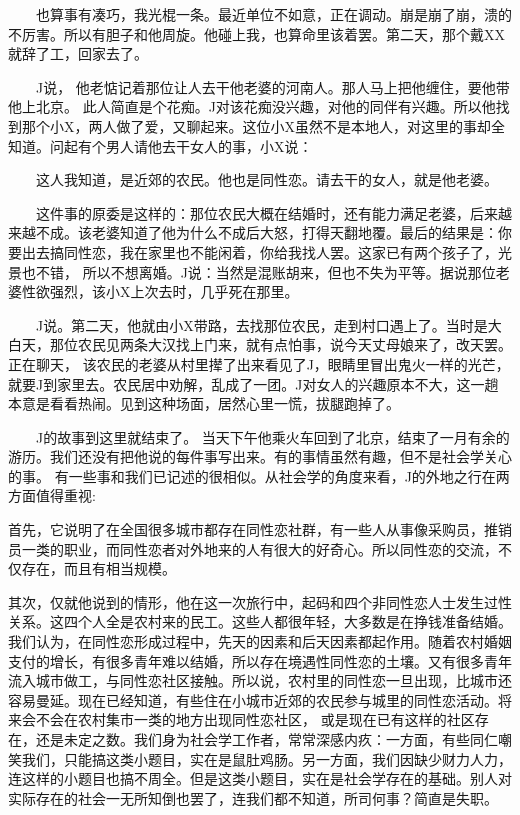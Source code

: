  　　也算事有凑巧，我光棍一条。最近单位不如意，正在调动。崩是崩了崩，溃的不厉害。所以有胆子和他周旋。他碰上我，也算命里该着罢。第二天，那个戴XX就辞了工，回家去了。 
 
 　　J说， 他老惦记着那位让人去干他老婆的河南人。那人马上把他缠住，要他带他上北京。 此人简直是个花痴。J对该花痴没兴趣，对他的同伴有兴趣。所以他找到那个小X，两人做了爱，又聊起来。这位小X虽然不是本地人，对这里的事却全知道。问起有个男人请他去干女人的事，小X说： 
 
 　　这人我知道，是近郊的农民。他也是同性恋。请去干的女人，就是他老婆。 
 
 　　这件事的原委是这样的：那位农民大概在结婚时，还有能力满足老婆，后来越来越不成。该老婆知道了他为什么不成后大怒，打得天翻地覆。最后的结果是：你要出去搞同性恋，我在家里也不能闲着，你给我找人罢。这家已有两个孩子了，光景也不错， 所以不想离婚。J说：当然是混账胡来，但也不失为平等。据说那位老婆性欲强烈，该小X上次去时，几乎死在那里。 
 
 　　J说。第二天，他就由小X带路，去找那位农民，走到村口遇上了。当时是大白天，那位农民见两条大汉找上门来，就有点怕事，说今天丈母娘来了，改天罢。正在聊天， 该农民的老婆从村里撵了出来看见了J，眼睛里冒出鬼火一样的光芒，就要J到家里去。农民居中劝解，乱成了一团。J对女人的兴趣原本不大，这一趟本意是看看热闹。见到这种场面，居然心里一慌，拔腿跑掉了。 
 
 　　J的故事到这里就结束了。 当天下午他乘火车回到了北京，结束了一月有余的游历。我们还没有把他说的每件事写出来。有的事情虽然有趣，但不是社会学关心的事。 有一些事和我们已记述的很相似。从社会学的角度来看，J的外地之行在两方面值得重视:

    首先，它说明了在全国很多城市都存在同性恋社群，有一些人从事像采购员，推销员一类的职业，而同性恋者对外地来的人有很大的好奇心。所以同性恋的交流，不仅存在，而且有相当规模。

    其次，仅就他说到的情形，他在这一次旅行中，起码和四个非同性恋人士发生过性关系。这四个人全是农村来的民工。这些人都很年轻，大多数是在挣钱准备结婚。我们认为，在同性恋形成过程中，先天的因素和后天因素都起作用。随着农村婚姻支付的增长，有很多青年难以结婚，所以存在境遇性同性恋的土壤。又有很多青年流入城市做工，与同性恋社区接触。所以说，农村里的同性恋一旦出现，比城市还容易曼延。现在已经知道，有些住在小城市近郊的农民参与城里的同性恋活动。将来会不会在农村集市一类的地方出现同性恋社区， 或是现在已有这样的社区存在，还是未定之数。我们身为社会学工作者，常常深感内疚：一方面，有些同仁嘲笑我们，只能搞这类小题目，实在是鼠肚鸡肠。另一方面，我们因缺少财力人力，连这样的小题目也搞不周全。但是这类小题目，实在是社会学存在的基础。别人对实际存在的社会一无所知倒也罢了，连我们都不知道，所司何事？简直是失职。

